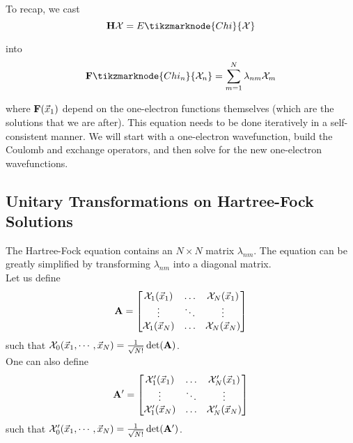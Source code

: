 \documentclass[12pt,a4paper,titlepage]{article}
\newcommand{\trm}[1]{\textrm{#1}} %
\newcommand{\Chi}{\mathcal{X}} %
\begin{document}
To recap, we cast
\begin{equation}
\vb{H}\Chi=E\tikzmarknode{Chi}{\Chi}
\end{equation}
into
\begin{equation}
\vb{F}\tikzmarknode{Chi_n}{\Chi_{n}}=\sum_{m=1}^{N}\lambda_{nm}\Chi_{m}
\end{equation}
where $\vb{F}(\vec{x}_{1})$ depend on the one-electron functions themselves (which are the solutions that we are after). This equation needs to be done iteratively in a self-consistent manner. We will start with a one-electron wavefunction, build the Coulomb and exchange operators, and then solve for the new one-electron wavefunctions.

\subsection{Unitary Transformations on Hartree-Fock Solutions}
The Hartree-Fock equation contains an $N\times N$ matrix $\lambda_{nm}$. The equation can be greatly simplified by transforming $\lambda_{nm}$ into a diagonal matrix.\\

Let us define
\begin{equation}
\vb{A}=\mqty[\Chi_{1}(\vec{x}_{1}) & \ldots & \Chi_{N}(\vec{x}_{1})\\ \vdots & \ddots & \vdots \\ \Chi_{1}(\vec{x}_{N}) & \ldots & \Chi_{N}(\vec{x}_{N})]
\end{equation}
such that $\Chi_{0}(\vec{x}_{1},\cdots,\vec{x}_{N})=\frac{1}{\sqrt{N!}}\det(\vb{A})$.\\

One can also define
\begin{equation}
\vb{A}^{\prime}=\mqty[\Chi_{1}^{\prime}(\vec{x}_{1}) & \ldots & \Chi_{N}^{\prime}(\vec{x}_{1})\\ \vdots & \ddots & \vdots \\ \Chi_{1}^{\prime}(\vec{x}_{N}) & \ldots & \Chi_{N}^{\prime}(\vec{x}_{N})]
\end{equation}
such that $\Chi_{0}^{\prime}(\vec{x}_{1},\cdots,\vec{x}_{N})=\frac{1}{\sqrt{N!}}\det(\vb{A}^{\prime})$.\\
\end{document}
